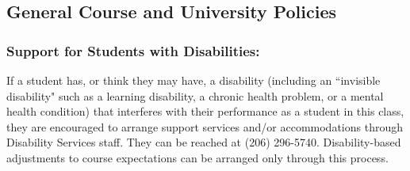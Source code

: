 \documentclass[16pt]{article}
\begin{document}
%	
%	
	
	\subsection*{General Course and University Policies}
	
	\subsubsection*{Support for Students with Disabilities:} If a student has, or think they may have, a disability (including an ``invisible disability" such as a learning disability, a chronic health problem, or a mental health condition) that interferes with their performance as a student in this class, they are encouraged to arrange support services and/or accommodations through Disability Services staff. They can be reached at (206) 296-5740. Disability-based adjustments to course expectations can be arranged only through this process.
	
\end{document}

